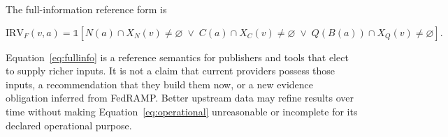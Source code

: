 \documentclass[11pt]{article}
\newcommand{\ind}{\mathds{1}}
\begin{document}
The full-information reference form is

\begin{keybox}
\begin{equation}
\mathrm{IRV}_{F}(v,a)=
\ind\!\left[
N(a)\cap X_N(v)\neq\varnothing
\;\lor\;
C(a)\cap X_C(v)\neq\varnothing
\;\lor\;
Q(B(a))\cap X_Q(v)\neq\varnothing
\right].
\label{eq:fullinfo}
\end{equation}
\end{keybox}

Equation~\ref{eq:fullinfo} is a reference semantics for publishers and tools
that elect to supply richer inputs. It is not a claim that current providers
possess those inputs, a recommendation that they build them now, or a new
evidence obligation inferred from FedRAMP. Better upstream data may refine
results over time without making Equation~\ref{eq:operational} unreasonable or
incomplete for its declared operational purpose.
\end{document}
